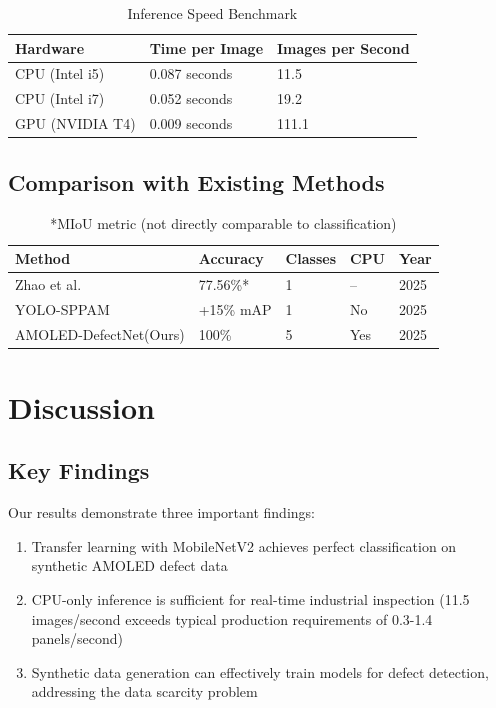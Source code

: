 \documentclass[12pt,a4paper]{article}
\newcommand{\model}{AMOLED-DefectNet}
\begin{document}
\begin{table}[H]
\centering
\caption{Inference Speed Benchmark}
\label{tab:speed}
\begin{tabular}{lll}
\toprule
\textbf{Hardware} & \textbf{Time per Image} & \textbf{Images per Second} \\
\midrule
CPU (Intel i5) & 0.087 seconds & 11.5 \\
CPU (Intel i7) & 0.052 seconds & 19.2 \\
GPU (NVIDIA T4) & 0.009 seconds & 111.1 \\
\bottomrule
\end{tabular}
\end{table}

\subsection{Comparison with Existing Methods}

\begin{table}[H]
\centering
\caption{Comparison with Prior Work}
\label{tab:comparison}
\begin{tabular}{lllll}
\toprule
\textbf{Method} & \textbf{Accuracy} & \textbf{Classes} & \textbf{CPU} & \textbf{Year} \\
\midrule
Zhao et al.~\cite{zhao2025lightweight} & 77.56\%* & 1 & -- & 2025 \\
YOLO-SPPAM~\cite{chen2025yolo} & +15\% mAP & 1 & No & 2025 \\
\model (Ours) & 100\% & 5 & Yes & 2025 \\
\bottomrule
\end{tabular}
\caption*{*MIoU metric (not directly comparable to classification)}
\end{table}


\section{Discussion}

\subsection{Key Findings}

Our results demonstrate three important findings:

\begin{enumerate}
\item Transfer learning with MobileNetV2 achieves perfect classification 
    on synthetic AMOLED defect data
\item CPU-only inference is sufficient for real-time industrial inspection 
    (11.5 images/second exceeds typical production requirements of 0.3-1.4 
    panels/second)
\item Synthetic data generation can effectively train models for defect 
    detection, addressing the data scarcity problem
\end{enumerate}
\end{document}
